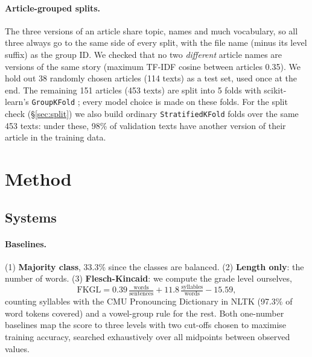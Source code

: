 \paragraph{Article-grouped splits.}
The three versions of an article share topic, names and much vocabulary, so all three always go to the same side of every split, with the file name (minus its level suffix) as the group ID. We checked that no two \emph{different} article names are versions of the same story (maximum TF-IDF cosine between articles 0.35). We hold out 38 randomly chosen articles (114 texts) as a test set, used once at the end. The remaining 151 articles (453 texts) are split into 5 folds with scikit-learn's \texttt{GroupKFold} \citep{pedregosa2011scikit}; every model choice is made on these folds. For the split check (\S\ref{sec:split}) we also build ordinary \texttt{StratifiedKFold} folds over the same 453 texts: under these, 98\% of validation texts have another version of their article in the training data.

\section{Method}
\label{sec:method}

\subsection{Systems}

\paragraph{Baselines.}
(1) \textbf{Majority class}, 33.3\% since the classes are balanced.
(2) \textbf{Length only}: the number of words.
(3) \textbf{Flesch-Kincaid}: we compute the grade level \citep{kincaid1975derivation} ourselves,
\[ \textrm{FKGL} = 0.39\,\tfrac{\textrm{words}}{\textrm{sentences}} + 11.8\,\tfrac{\textrm{syllables}}{\textrm{words}} - 15.59, \]
counting syllables with the CMU Pronouncing Dictionary in NLTK \citep{bird2009nltk} (97.3\% of word tokens covered) and a vowel-group rule for the rest. Both one-number baselines map the score to three levels with two cut-offs chosen to maximise training accuracy, searched exhaustively over all midpoints between observed values.


